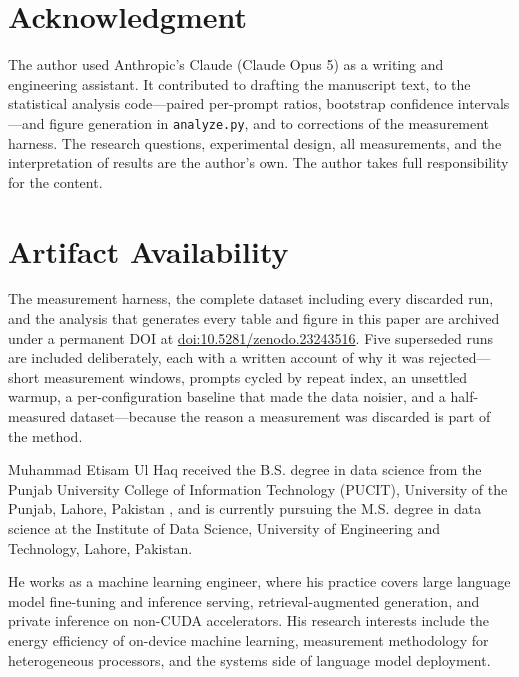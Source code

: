 \documentclass[journal]{IEEEtran}
\newif\ifanon
\newif\ifpreprint
\begin{document}
\section*{Acknowledgment}
The author used Anthropic's Claude (Claude Opus 5) as a writing and engineering
assistant. It contributed to drafting the manuscript text, to the statistical
analysis code---paired per-prompt ratios, bootstrap confidence intervals---and
figure generation in \texttt{analyze.py}, and to corrections of the measurement
harness. The research questions, experimental design, all measurements, and the
interpretation of results are the author's own. The author takes full
responsibility for the content.

\section*{Artifact Availability}
The measurement harness, the complete dataset including every discarded run,
and the analysis that generates every table and figure in this paper are
archived under a permanent DOI\ifanon, withheld for double-anonymized review
because the repository identifies the author and supplied on the title page\else{} at
\href{https://doi.org/10.5281/zenodo.23243516}{doi:10.5281/zenodo.23243516}\fi.
Five superseded runs are included
deliberately, each with a written account of why it was rejected---short
measurement windows, prompts cycled by repeat index, an unsettled warmup, a
per-configuration baseline that made the data noisier, and a half-measured
dataset---because the reason a measurement was discarded is part of the method.




\ifanon
\else
\begin{IEEEbiographynophoto}{Muhammad Etisam Ul Haq}
received the B.S. degree in data science from the Punjab University College of
Information Technology (PUCIT), University of the Punjab, Lahore, Pakistan%
\ifpreprint.\else, and
is currently pursuing the M.S. degree in data science at the Institute of Data
Science, University of Engineering and Technology, Lahore, Pakistan.\fi

He works as a machine learning engineer, where his practice covers large
language model fine-tuning and inference serving, retrieval-augmented
generation, and private inference on non-CUDA accelerators. His research
interests include the energy efficiency of on-device machine learning,
measurement methodology for heterogeneous processors, and the systems side of
language model deployment.
\end{IEEEbiographynophoto}
\fi
\end{document}
